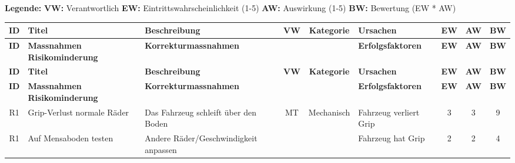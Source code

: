 \documentclass[../main.tex]{subfiles}
\begin{document}
\begin{landscape}
\scriptsize

\textbf{Legende:}
\hspace{1cm}
\textbf{VW:} Verantwortlich
\hspace{1cm}
\textbf{EW:} Eintrittswahrscheinlichkeit (1-5)
\hspace{1cm}
\textbf{AW:} Auswirkung (1-5)
\hspace{1cm}
\textbf{BW:} Bewertung (EW * AW)

\renewcommand{\arraystretch}{1.5} %
\begin{longtable}{|c|p{4cm}|p{4cm}|c|c|p{4cm}|c|c|c|}
\hline
\rowcolor{white} 
\textbf{ID} & \textbf{Titel} & \textbf{Beschreibung} & \textbf{VW} & \textbf{Kategorie} & \textbf{Ursachen} & \textbf{EW} & \textbf{AW} & \textbf{BW} \\ \hline
\rowcolor{white}
\textbf{ID} & \textbf{Massnahmen Risikominderung} & \textbf{Korrekturmassnahmen} & & & \textbf{Erfolgsfaktoren} & \textbf{EW} & \textbf{AW} & \textbf{BW} \\ \hline
\endfirsthead
\hline
\rowcolor{white} 
\textbf{ID} & \textbf{Titel} & \textbf{Beschreibung} & \textbf{VW} & \textbf{Kategorie} & \textbf{Ursachen} & \textbf{EW} & \textbf{AW} & \textbf{BW} \\ \hline
\rowcolor{white}
\textbf{ID} & \textbf{Massnahmen Risikominderung} & \textbf{Korrekturmassnahmen} & & & \textbf{Erfolgsfaktoren} & \textbf{EW} & \textbf{AW} & \textbf{BW} \\ \hline
\endhead

\rowcolor[HTML]{F5F5F5} R1 & Grip-Verlust normale Räder & Das Fahrzeug schleift über den Boden & MT & Mechanisch & Fahrzeug verliert Grip & 3 & 3 & 9 \\ \hline
\rowcolor[HTML]{F5F5F5} R1 & Auf Mensaboden testen & Andere Räder/Geschwindigkeit anpassen & & & Fahrzeug hat Grip & 2 & 2 & 4 \\ \hline


\end{longtable}
\end{landscape}
\end{document}
